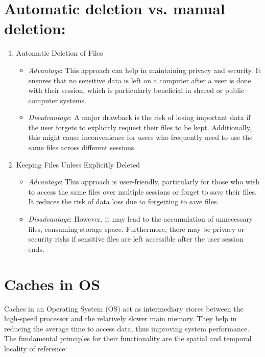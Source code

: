 \documentclass{article}
\begin{document}
\section{Automatic deletion vs. manual deletion:}
\begin{enumerate}

	\item Automatic Deletion of Files
	      \begin{itemize}
		      \item \textit{Advantage}: This approach can help in maintaining privacy and security.
		            It ensures that no sensitive data is left on a computer after a user is done with
		            their session, which is particularly beneficial in shared or public computer systems.
		      \item \textit{Disadvantage}: A major drawback is the risk of losing important data if the
		            user forgets to explicitly request their files to be kept. Additionally, this might
		            cause inconvenience for users who frequently need to use the same files across different sessions.
	      \end{itemize}

	\item Keeping Files Unless Explicitly Deleted
	      \begin{itemize}
		      \item \textit{Advantage}: This approach is user-friendly, particularly for those who wish to
		            access the same files over multiple sessions or forget to save their files. It reduces
		            the risk of data loss due to forgetting to save files.
		      \item \textit{Disadvantage}: However, it may lead to the accumulation of unnecessary files,
		            consuming storage space. Furthermore, there may be privacy or security risks if
		            sensitive files are left accessible after the user session ends.
	      \end{itemize}

\end{enumerate}


\section{Caches in OS}%
Caches in an Operating System (OS) act as intermediary stores between the high-speed processor and the relatively slower main memory.
They help in reducing the average time to access data, thus improving system performance.
The fundamental principles for their functionality are the spatial and temporal locality of reference:
\end{document}

